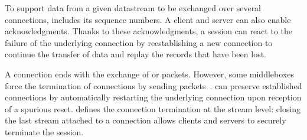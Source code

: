 To support data from a given datastream to be exchanged over several \tcp
connections, \tcpls includes its sequence numbers. A client and server can also
enable acknowledgments. Thanks to these \tcpls
acknowledgments, a \tcpls session can react to the failure of the underlying
\tcp connection by reestablishing a new \tcp connection to continue the transfer
of data and replay the records that have been lost.

A \tcp connection ends with the exchange of \fin or \rst packets. However,
some middleboxes force the termination of \tcp connections
by sending \rst packets~\cite{rfc3360,weaver2009detecting}. \tcpls
can preserve established connections by automatically restarting
the underlying \tcp connection upon reception of a spurious reset. \tcpls
defines the connection termination at the stream level: closing the last stream
attached to a \tcp connection allows clients and servers to securely
terminate the \tcpls session.



